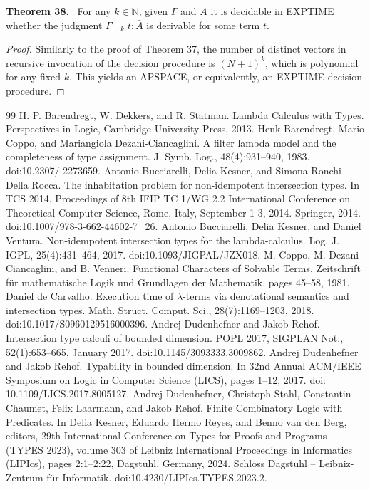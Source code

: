 \documentclass[10pt,a4paper]{article}
\newcommand{\Av}{\bar A}\newcommand{\Bv}{\bar B}\newcommand{\Cv}{\bar C}
\newcommand{\pmjudgment}[3]{#1\vdash_k #2:#3}
\newcommand{\orig}[2]{\par\medskip\noindent\textbf{#1 #2.}\ }
\begin{document}
\orig{Theorem}{38} For any $k\in\mathbb N$, given $\Gamma$ and $\Av$ it is decidable in EXPTIME whether the judgment $\pmjudgment\Gamma t\Av$ is derivable for some term $t$.

\begin{proof}
Similarly to the proof of Theorem 37, the number of distinct vectors in recursive invocation of the decision procedure is $(N+1)^k$, which is polynomial for any fixed $k$. This yields an APSPACE, or equivalently, an EXPTIME decision procedure.
\end{proof}

\begin{thebibliography}{99}
 H. P. Barendregt, W. Dekkers, and R. Statman. Lambda Calculus with Types. Perspectives in Logic, Cambridge University Press, 2013.
 Henk Barendregt, Mario Coppo, and Mariangiola Dezani-Ciancaglini. A filter lambda model and the completeness of type assignment. J. Symb. Log., 48(4):931–940, 1983. doi:10.2307/ 2273659.
 Antonio Bucciarelli, Delia Kesner, and Simona Ronchi Della Rocca. The inhabitation problem for non-idempotent intersection types. In TCS 2014, Proceedings of 8th IFIP TC 1/WG 2.2 International Conference on Theoretical Computer Science, Rome, Italy, September 1-3, 2014. Springer, 2014. doi:10.1007/978-3-662-44602-7\_26.
 Antonio Bucciarelli, Delia Kesner, and Daniel Ventura. Non-idempotent intersection types for the lambda-calculus. Log. J. IGPL, 25(4):431–464, 2017. doi:10.1093/JIGPAL/JZX018.
 M. Coppo, M. Dezani-Ciancaglini, and B. Venneri. Functional Characters of Solvable Terms. Zeitschrift für mathematische Logik und Grundlagen der Mathematik, pages 45–58, 1981.
 Daniel de Carvalho. Execution time of \ensuremath{\lambda}-terms via denotational semantics and intersection types. Math. Struct. Comput. Sci., 28(7):1169–1203, 2018. doi:10.1017/S0960129516000396.
 Andrej Dudenhefner and Jakob Rehof. Intersection type calculi of bounded dimension. POPL 2017, SIGPLAN Not., 52(1):653–665, January 2017. doi:10.1145/3093333.3009862.
 Andrej Dudenhefner and Jakob Rehof. Typability in bounded dimension. In 32nd Annual ACM/IEEE Symposium on Logic in Computer Science (LICS), pages 1–12, 2017. doi: 10.1109/LICS.2017.8005127.
 Andrej Dudenhefner, Christoph Stahl, Constantin Chaumet, Felix Laarmann, and Jakob Rehof. Finite Combinatory Logic with Predicates. In Delia Kesner, Eduardo Hermo Reyes, and Benno van den Berg, editors, 29th International Conference on Types for Proofs and Programs (TYPES 2023), volume 303 of Leibniz International Proceedings in Informatics (LIPIcs), pages 2:1–2:22, Dagstuhl, Germany, 2024. Schloss Dagstuhl – Leibniz-Zentrum für Informatik. doi:10.4230/LIPIcs.TYPES.2023.2.

\end{thebibliography}
\end{document}
